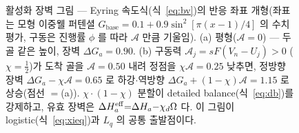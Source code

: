 \begin{figure}[t]
\caption{활성화 장벽 그림 --- Eyring 속도식(식~\eqref{eq:bv})의 반응 좌표 개형(좌표는 모형 이중웰 퍼텐셜
$G_\mathrm{base}{=}0.1{+}0.9\sin^2[\pi(x{-}1)/4]$ 의 수치 평가, 구동은 진행률 $\phi$ 를 따라 $\mathcal A$ 만큼 기울임).
(a) 평형($\mathcal A{=}0$) --- 두 골 같은 높이, 장벽 $\Delta G_a{=}0.90$. (b) 구동력 $\mathcal A_j{=}sF(V_n{-}U_j){>}0$
($\chi{=}\tfrac12$)가 도착 골을 $\mathcal A{=}0.50$ 내려 정점을 $\chi\mathcal A{=}0.25$ 낮추면, 정방향 장벽
$\Delta G_a{-}\chi\mathcal A{=}0.65$ 로 하강$\cdot$역방향 $\Delta G_a{+}(1{-}\chi)\mathcal A{=}1.15$ 로 상승(점선 $=$(a)).
$\chi\!\cdot\!(1{-}\chi)$ 분할이 detailed balance(식~\eqref{eq:db})를 강제하고, 유효 장벽은 $\Delta H_a^{\mathrm{eff}}{=}\Delta H_a{-}\chi_d\Omega$
다. 이 그림이 logistic(식~\eqref{eq:xieq})과 $L_q$ 의 공통 출발점이다.}
\label{fig:barrier}
\end{figure}

